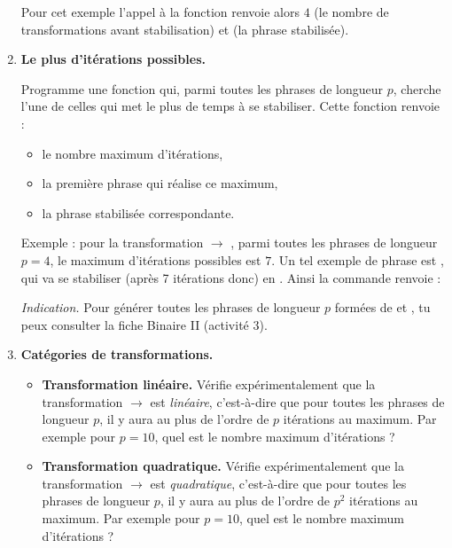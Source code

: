 \documentclass[11pt,class=report,crop=false]{standalone}
\begin{document}
\begin{activite}
\begin{enumerate}
\medskip

Pour cet exemple l'appel à la fonction  renvoie alors $4$ (le nombre de transformations avant stabilisation) et  (la phrase stabilisée).

	\item \textbf{Le plus d'itérations possibles.}
	
	Programme une fonction  
qui, parmi toutes les phrases de longueur $p$, cherche l'une de celles qui met le plus de temps à se stabiliser. Cette fonction renvoie :
\begin{itemize}
  \item le nombre maximum d'itérations,
  \item la première phrase qui réalise ce maximum,
  \item la phrase stabilisée correspondante.
\end{itemize}

Exemple : pour la transformation \rzero\run{} $\rightarrow$ \run\rzero\rzero, parmi toutes les phrases de longueur $p=4$, le maximum d'itérations possibles est $7$. Un tel exemple de phrase est \rzero\run\run\run, qui va se stabiliser (après 7 itérations donc) en \run\run\run\rzero\rzero\rzero\rzero\rzero\rzero\rzero\rzero.
Ainsi la commande  renvoie : 


  \emph{Indication.} Pour générer toutes les phrases de longueur $p$ formées de \rzero{} et \run{}, tu peux consulter la fiche \og{}Binaire II\fg{} (activité 3).

	\item \textbf{Catégories de transformations.}
	
	\begin{itemize} 
	\item \textbf{Transformation linéaire.}
	Vérifie expérimentalement que la transformation \rzero\rzero\run\run{} $\rightarrow$ \run\run\rzero{} est \emph{linéaire}, c'est-à-dire que pour toutes les phrases de longueur $p$, il y aura au plus de l'ordre de $p$ itérations au maximum. Par exemple pour $p=10$, quel est le nombre maximum d'itérations  ?
	
	\item \textbf{Transformation quadratique.}
	Vérifie expérimentalement que la transformation \rzero\run{} $\rightarrow$ \run\rzero{} est \emph{quadratique}, c'est-à-dire que pour toutes les phrases de longueur $p$, il y aura au plus de l'ordre de $p^2$ itérations au maximum. Par exemple pour $p=10$, quel est le nombre maximum d'itérations  ?
	

\end{itemize}
\end{enumerate}
\end{activite}
\end{document}
